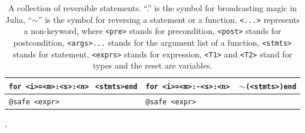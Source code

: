 \documentclass[aps,twocolumn,longbibliography,english,superscriptaddress]{revtex4-1}
\newcommand{\<}{\langle}
\renewcommand{\>}{\rangle}
\newcommand{\cquad}{{{ }_{\quad}}}
\newcommand{\App}[1]{Appendix \ref{#1}}
\theoremstyle{definition}\newtheorem{definition}{\textit{Definition}}
\begin{document}
\begin{table}[h!]
\begin{minipage}{\columnwidth}
{\begin{tabularx}{\textwidth}{X X}
            \hline
            \texttt{for <i>=<m>:<s>:<n>}\newline $\cquad$\texttt{<stmts>}\newline \texttt{end} & \texttt{for <i>=<m>:-<s>:<n>}\newline $\cquad$ \texttt{$\sim$(<stmts>)}\newline \texttt{end}\\
            \hline
            \texttt{@safe <expr>} & \texttt{@safe <expr>}\\
            \bottomrule
        \end{tabularx}
    }
    \caption{A collection of reversible statements.
    ``.'' is the symbol for broadcasting magic in Julia,
    ``$\sim$'' is the symbol for reversing a statement or a function.
    \texttt{<...>} represents a non-keyword, 
    where \texttt{<pre>} stands for precondition, 
    \texttt{<post>} stands for postcondition,
    \texttt{<args>...} stands for the argument list of a function,
    \texttt{<stmts>} stands for statement,
    \texttt{<exprs>} stands for expression,
    \texttt{<T1>} and \texttt{<T2>} stand for types and the reset are variables.
}\label{tbl:revstatements},
\end{minipage}
\end{table}

\end{document}
